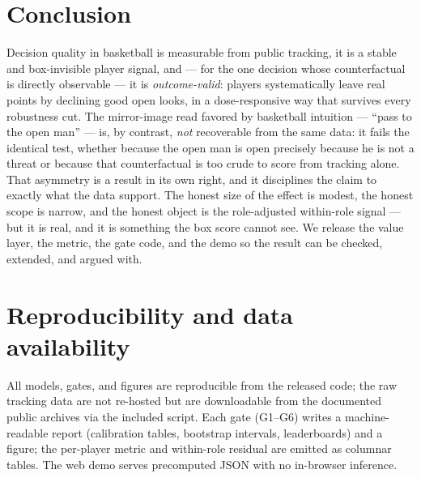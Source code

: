 \documentclass[11pt]{article}
\begin{document}
\section{Conclusion}
Decision quality in basketball is measurable from public tracking, it is a stable and box-invisible player
signal, and --- for the one decision whose counterfactual is directly observable --- it is
\emph{outcome-valid}: players systematically leave real points by declining good open looks, in a
dose-responsive way that survives every robustness cut. The mirror-image read favored by basketball
intuition --- ``pass to the open man'' --- is, by contrast, \emph{not} recoverable from the same data: it
fails the identical test, whether because the open man is open precisely because he is not a threat or
because that counterfactual is too crude to score from tracking alone. That asymmetry is a result in its
own right, and it disciplines the claim to exactly what the data support. The
honest size of the effect is modest, the honest scope is narrow, and the honest object is the
role-adjusted within-role signal --- but it is real, and it is something the box score cannot see. We
release the value layer, the metric, the gate code, and the demo so the result can be checked, extended,
and argued with.

\section*{Reproducibility and data availability}
All models, gates, and figures are reproducible from the released code; the raw tracking data are not
re-hosted but are downloadable from the documented public archives \citep{linou2016movements} via the
included script. Each gate (G1--G6) writes a machine-readable report (calibration tables, bootstrap
intervals, leaderboards) and a figure; the per-player metric and within-role residual are emitted as
columnar tables. The web demo serves precomputed JSON with no in-browser inference.

{\small


}
\end{document}
